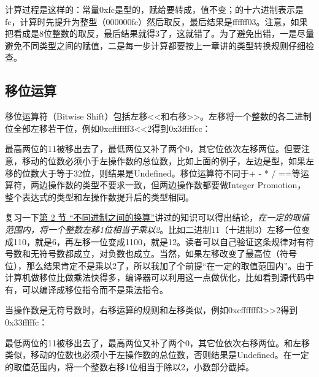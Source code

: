 

计算过程是这样的：常量0xfc是型的，赋给要转成，值不变；的十六进制表示是fc，计算时先提升为整型（000000fc）然后取反，最后结果是ffffff03。注意，如果把看成是8位整数的取反，最后结果就得3了，这就错了。为了避免出错，一是尽量避免不同类型之间的赋值，二是每一步计算都要按上一章讲的类型转换规则仔细检查。


\subsection{移位运算}
%


移位运算符（Bitwise Shift）包括左移\textless{}\textless{}和右移\textgreater{}\textgreater{}。左移将一个整数的各二进制位全部左移若干位，例如0xcfffffff3\textless{}\textless{}2得到0x3fffffcc：




最高两位的11被移出去了，最低两位又补了两个0，其它位依次左移两位。但要注意，移动的位数必须小于左操作数的总位数，比如上面的例子，左边是型，如果左移的位数大于等于32位，则结果是Undefined。移位运算符不同于+ - * / ==等运算符，两边操作数的类型不要求一致，但两边操作数都要做Integer Promotion，整个表达式的类型和左操作数提升后的类型相同。



复习一下\hyperlink{db.ch14s02.id2753213}{第 2 节 “不同进制之间的换算”}讲过的知识可以得出结论，\emph{在一定的取值范围内，将一个整数左移1位相当于乘以2}。比如二进制11（十进制3）左移一位变成110，就是6，再左移一位变成1100，就是12。读者可以自己验证这条规律对有符号数和无符号数都成立，对负数也成立。当然，如果左移改变了最高位（符号位），那么结果肯定不是乘以2了，所以我加了个前提“在一定的取值范围内”。由于计算机做移位比做乘法快得多，编译器可以利用这一点做优化，比如看到源代码中有，可以编译成移位指令而不是乘法指令。



当操作数是无符号数时，右移运算的规则和左移类似，例如0xcfffffff3\textgreater{}\textgreater{}2得到0x33fffffc：




最低两位的11被移出去了，最高两位又补了两个0，其它位依次右移两位。和左移类似，移动的位数也必须小于左操作数的总位数，否则结果是Undefined。在一定的取值范围内，将一个整数右移1位相当于除以2，小数部分截掉。



